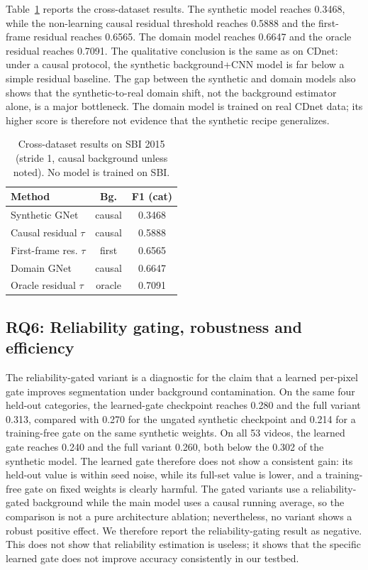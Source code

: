 \documentclass[sn-mathphys-num,iicol]{sn-jnl}
\begin{document}
Table~\ref{tab:sbi} reports the cross-dataset results. The synthetic model reaches
0.3468, while the non-learning causal residual threshold reaches 0.5888 and the
first-frame residual reaches 0.6565. The domain model reaches 0.6647 and the
oracle residual reaches 0.7091. The qualitative conclusion is the same as on
CDnet: under a causal protocol, the synthetic background+CNN model is far below a
simple residual baseline. The gap between the synthetic and domain models also
shows that the synthetic-to-real domain shift, not the background estimator
alone, is a major bottleneck. The domain model is trained on real CDnet data; its
higher score is therefore not evidence that the synthetic recipe generalizes.

\begin{table}[t]
\centering
\footnotesize
\setlength{\tabcolsep}{3pt}
\caption{Cross-dataset results on SBI 2015 (stride 1, causal background unless
noted). No model is trained on SBI.}
\label{tab:sbi}
\begin{tabular}{lcc}
\toprule
Method & Bg. & F1 (cat) \\
\midrule
Synthetic GNet & causal & 0.3468 \\
Causal residual $\tau$ & causal & 0.5888 \\
First-frame res. $\tau$ & first & 0.6565 \\
Domain GNet & causal & 0.6647 \\
Oracle residual $\tau$ & oracle & 0.7091 \\
\bottomrule
\end{tabular}
\end{table}

\subsection{RQ6: Reliability gating, robustness and efficiency}\label{sec:rq6}

The reliability-gated variant is a diagnostic for the claim that a learned
per-pixel gate improves segmentation under background contamination. On the same
four held-out categories, the learned-gate checkpoint reaches 0.280 and the full
variant 0.313, compared with 0.270 for the ungated synthetic checkpoint and 0.214
for a training-free gate on the same synthetic weights. On all 53 videos, the
learned gate reaches 0.240 and the full variant 0.260, both below the 0.302 of
the synthetic model. The learned gate therefore does not show a consistent gain: its
held-out value is within seed noise, while its full-set value is lower, and a
training-free gate on fixed weights is clearly harmful. The gated variants use a
reliability-gated background while the main model uses a causal running average,
so the comparison is not a pure architecture ablation; nevertheless, no variant
shows a robust positive effect. We therefore report the reliability-gating result
as negative. This does not show that reliability estimation is useless; it shows
that the specific learned gate does not improve accuracy consistently in our
testbed.
\end{document}
